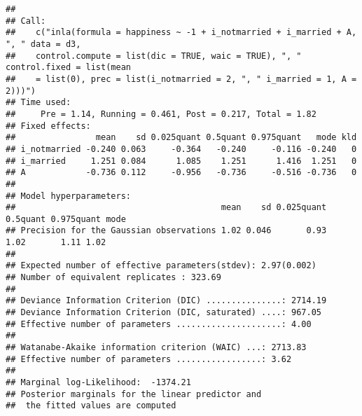 \documentclass[
]{article}
\newenvironment{Shaded}{\begin{snugshade}}{\end{snugshade}}
\newcommand{\DataTypeTok}[1]{\textcolor[rgb]{0.13,0.29,0.53}{#1}}
\newcommand{\DecValTok}[1]{\textcolor[rgb]{0.00,0.00,0.81}{#1}}
\newcommand{\FloatTok}[1]{\textcolor[rgb]{0.00,0.00,0.81}{#1}}
\newcommand{\KeywordTok}[1]{\textcolor[rgb]{0.13,0.29,0.53}{\textbf{#1}}}
\newcommand{\NormalTok}[1]{#1}
\newcommand{\OperatorTok}[1]{\textcolor[rgb]{0.81,0.36,0.00}{\textbf{#1}}}
\newcommand{\OtherTok}[1]{\textcolor[rgb]{0.56,0.35,0.01}{#1}}
\newcommand{\StringTok}[1]{\textcolor[rgb]{0.31,0.60,0.02}{#1}}
\begin{document}
\begin{Shaded}
\end{Shaded}

\begin{verbatim}
## 
## Call:
##    c("inla(formula = happiness ~ -1 + i_notmarried + i_married + A, ", " data = d3, 
##    control.compute = list(dic = TRUE, waic = TRUE), ", " control.fixed = list(mean 
##    = list(0), prec = list(i_notmarried = 2, ", " i_married = 1, A = 2)))") 
## Time used:
##     Pre = 1.14, Running = 0.461, Post = 0.217, Total = 1.82 
## Fixed effects:
##                mean    sd 0.025quant 0.5quant 0.975quant   mode kld
## i_notmarried -0.240 0.063     -0.364   -0.240     -0.116 -0.240   0
## i_married     1.251 0.084      1.085    1.251      1.416  1.251   0
## A            -0.736 0.112     -0.956   -0.736     -0.516 -0.736   0
## 
## Model hyperparameters:
##                                         mean    sd 0.025quant 0.5quant 0.975quant mode
## Precision for the Gaussian observations 1.02 0.046       0.93     1.02       1.11 1.02
## 
## Expected number of effective parameters(stdev): 2.97(0.002)
## Number of equivalent replicates : 323.69 
## 
## Deviance Information Criterion (DIC) ...............: 2714.19
## Deviance Information Criterion (DIC, saturated) ....: 967.05
## Effective number of parameters .....................: 4.00
## 
## Watanabe-Akaike information criterion (WAIC) ...: 2713.83
## Effective number of parameters .................: 3.62
## 
## Marginal log-Likelihood:  -1374.21 
## Posterior marginals for the linear predictor and
##  the fitted values are computed
\end{verbatim}
\end{document}
